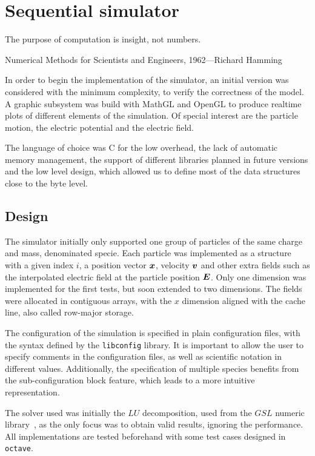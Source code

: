\chapter{Sequential simulator}
\label{ch:sequential}

\epigraph{The purpose of computation is insight, not numbers.}{Numerical Methods 
for Scientists and Engineers, 1962---Richard Hamming}

In order to begin the implementation of the simulator, an initial version was
considered with the minimum complexity, to verify the correctness of the model.
A graphic subsystem was build with MathGL and OpenGL to produce realtime plots
of different elements of the simulation. Of special interest are the particle
motion, the electric potential and the electric field.

The language of choice was C for the low overhead, the lack of automatic memory
management, the support of different libraries planned in future versions and
the low level design, which allowed us to define most of the data structures
close to the byte level.

\section{Design}

The simulator initially only supported one group of particles of the same charge
and mass, denominated specie. Each particle was implemented as a structure with
a given index $i$, a position vector $\bm{x}$, velocity $\bm{v}$ and other extra fields
such as the interpolated electric field at the particle position $\bm{E}$.
%
Only one dimension was implemented for the first tests, but soon extended to two 
dimensions.  The fields were allocated in contiguous arrays, with the $x$ 
dimension aligned with the cache line, also called row-major storage.

The configuration of the simulation is specified in plain configuration files, 
with the syntax defined by the \texttt{libconfig} library. It is important to 
allow the user to specify comments in the configuration files, as well as 
scientific notation in different values. Additionally, the specification of 
multiple species benefits from the sub-configuration block feature, which leads 
to a more intuitive representation.

The solver used was initially the $LU$ decomposition, used from the $GSL$
numeric library~\cite{gsl}, as the only focus was to obtain valid results, ignoring the
performance. All implementations are tested beforehand with some test cases
designed in \texttt{octave}.

